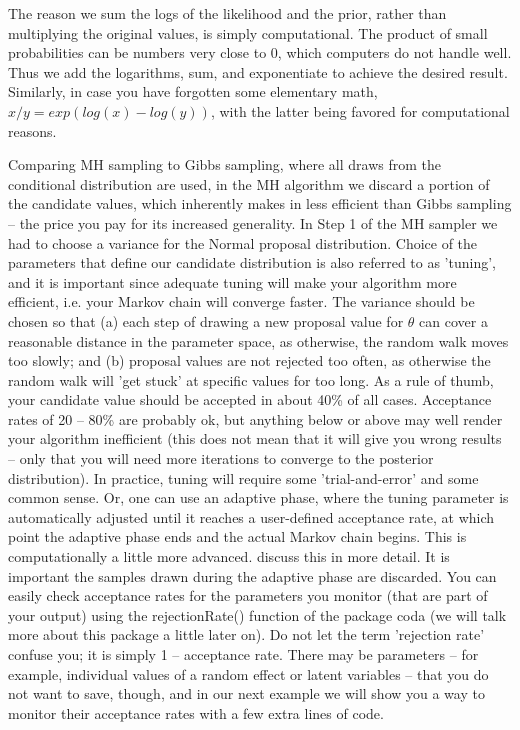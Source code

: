 The reason we sum the logs of the likelihood and the prior, rather than multiplying the original values, is simply computational. The product of small probabilities can be numbers very close to 0, which computers do not handle well. Thus we add the logarithms, sum, and exponentiate to achieve the desired result. Similarly, in case you have forgotten some elementary math, $x/y = exp(log(x)-log(y))$, with the latter being favored for computational reasons. 

Comparing MH sampling to Gibbs sampling, where all draws from the conditional distribution are used, in the MH algorithm we discard a portion of the candidate values, which inherently makes in less efficient than Gibbs sampling – the price you pay for its increased generality.  
In Step 1 of the MH sampler we had to choose a variance for the Normal proposal distribution. Choice of the parameters that define our candidate distribution is also referred to as 'tuning', and it is important since adequate tuning will make your algorithm more efficient, i.e. your Markov chain will converge faster. The variance should be chosen so that (a) each step of drawing a new proposal value for $\theta$ can cover a reasonable distance in the parameter space, as otherwise, the random walk moves too slowly; and (b) proposal values are not rejected too often, as otherwise the random walk will 'get stuck' at specific values for too long.  As a rule of thumb, your candidate value should be accepted in about 40\% of all cases. Acceptance rates of 20 – 80\% are probably ok, but anything below or above may well render your algorithm inefficient (this does not mean that it will give you wrong results – only that you will need more iterations to converge to the posterior distribution). In practice, tuning will require some 'trial-and-error' and some common sense. Or, one can use an adaptive phase, where the tuning parameter is automatically adjusted until it reaches a user-defined acceptance rate, at which point the adaptive phase ends and the actual Markov chain begins. This is computationally a little more advanced. \citet{link_barker:2009} discuss this in more detail. It is important the samples drawn during the adaptive phase are discarded.
You can easily check acceptance rates for the parameters you monitor (that are part of your output) using the rejectionRate() function of the package coda (we will talk more about this package a little later on). Do not let the term 'rejection rate' confuse you; it is simply 1 – acceptance rate. There may be parameters – for example, individual values of a random effect or latent variables – that you do not want to save, though, and in our next example we will show you a way to monitor their acceptance rates with a few extra lines of code. 

